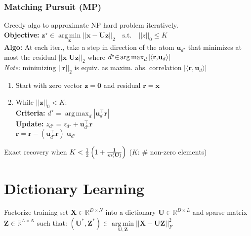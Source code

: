 \documentclass[a4paper,11pt]{article}
\newcommand{\argmax}{\operatorname*{arg\,max}}
\newcommand{\argmin}{\operatorname*{arg\,min}}
\newcommand{\R}{\mathbb{R}}
\begin{document}
\begin{multicols}{2}
\subsubsection{Matching Pursuit (MP)}
Greedy algo to approximate NP hard problem iteratively.\\
\textbf{Objective:} $\textbf{z}^\star \in \argmin \limits_\textbf{z} || \mathbf{x} - \mathbf{U} \mathbf{z}||_2 \quad \text{s.t.} \quad ||z||_0 \leq K$\\
\textbf{Algo:}
At each iter., take a step in direction of the atom $\mathbf u_{d^\star}$ that minimizes at most the residual $||\mathbf x \text{-} \mathbf U \mathbf z||_2$ where $d^\star \hspace{-0.1cm} \in \hspace{-0.05cm} \argmax_d | \langle \mathbf{r}, \hspace{-0.05cm} \mathbf{u}_d \rangle|$\\
\emph{Note:} minimizing $||\mathbf{r}||_2$ is equiv. as maxim. abs. correlation $| \langle \mathbf{r}, \mathbf{u}_d \rangle |$
\begin{enumerate}[leftmargin=0.5cm]
  \itemsep0em 
  \item Start with zero vector $\mathbf z = \mathbf 0$ and residual $\mathbf r = \mathbf x$
  \item While $|| \mathbf{z} ||_0 < K$:\\
    \textbf{Criteria:} $d^\star = \argmax_d | \mathbf u_d^\top \mathbf r |$\\
    \textbf{Update:} $z_{d^\star} = z_{d^\star} + \mathbf u_{d^\star}^\top \mathbf r$\\
        \hspace{1.55cm} $\mathbf r = \mathbf r - (\mathbf u_{d^\star}^\top \mathbf r) \; \mathbf u_{d^\star}$
\end{enumerate}
Exact recovery when $K < {1 \over 2} \left( 1 + {1 \over m(\mathbf U)} \right)$ ($K$: \# non-zero elements)
\vfill
\columnbreak
\section{Dictionary Learning}
Factorize training set $\mathbf X \in \R^{D\times N}$ into a dictionary $\mathbf U \in \R^{D\times L}$ and sparse matrix $\mathbf Z \in \R^{L\times N}$ such that:
$(\mathbf U^*, \mathbf Z^*) \in \argmin \limits_{\mathbf U, \mathbf Z} ||\mathbf X - \mathbf U \mathbf Z||_F^2$ \\


\end{multicols}
\end{document}
